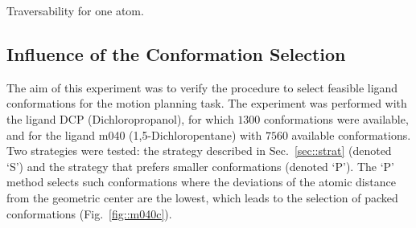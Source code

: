 \documentclass[usletter, 10pt, conference]{ieeeconf} %
\def\LA{L_1}
\def\LB{L_2}
\begin{document}
\begin{table}[ht]
\centering
\caption{\label{tab::one}Traversability for one atom.}
\renewcommand{\tabcolsep}{4.3pt}
{\small
\renewcommand{\arraystretch}{0.7}

}
\end{table}


%
%





%

\subsection{Influence of the Conformation Selection}

The aim of this experiment was to verify the procedure to select feasible ligand conformations for the motion planning task.
The experiment was performed with the ligand DCP (Dichloropropanol), for which $1300$ conformations were available, and for the ligand
m040 (1,5-Dichloropentane) with $7560$ available conformations.
Two strategies were tested: the strategy described in Sec.~\ref{sec::strat} (denoted `S') and the strategy that prefers smaller conformations (denoted `P').
The `P' method selects such conformations where the deviations of the atomic distance from the geometric center are the lowest, which leads 
to the selection of packed conformations (Fig.~\ref{fig::m040c}).
\end{document}
